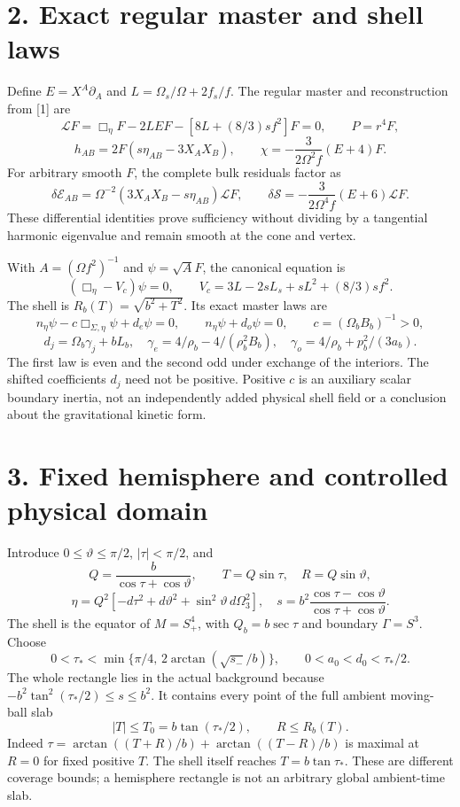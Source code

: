 \documentclass[
  10pt,
]{article}
\begin{document}
\section{2. Exact regular master and shell
laws}\label{exact-regular-master-and-shell-laws}

Define \(E=X^A\partial_A\) and \(L=\Omega_s/\Omega+2f_s/f\). The regular
master and reconstruction from {[}1{]} are \[
 \mathcal LF=\Box_\eta F-2LEF-[8L+(8/3)sf^2]F=0,
 \qquad P=r^4F,
\] \[
 h_{AB}=2F(s\eta_{AB}-3X_AX_B),\qquad
 \chi=-\frac3{2\Omega^2f}(E+4)F.                           \tag{5}
\] For arbitrary smooth \(F\), the complete bulk residuals factor as \[
 \delta\mathscr E_{AB}=\Omega^{-2}(3X_AX_B-s\eta_{AB})\mathcal LF,
 \qquad
 \delta\mathscr S=-\frac3{2\Omega^4f}(E+6)\mathcal LF.       \tag{6}
\] These differential identities prove sufficiency without dividing by a
tangential harmonic eigenvalue and remain smooth at the cone and vertex.

With \(A=(\Omega f^2)^{-1}\) and \(\psi=\sqrt A F\), the canonical
equation is \[
 (\Box_\eta-V_c)\psi=0,\qquad
 V_c=3L-2sL_s+sL^2+(8/3)sf^2.                              \tag{7}
\] The shell is \(R_b(T)=\sqrt{b^2+T^2}\). Its exact master laws are \[
 n_\eta\psi-c\Box_{\Sigma,\eta}\psi+d_e\psi=0,
 \qquad n_\eta\psi+d_o\psi=0,\qquad c=(\Omega_b B_b)^{-1}>0,
\] \[
 d_j=\Omega_b\gamma_j+bL_b,\quad
 \gamma_e=4/\rho_b-4/(\rho_b^2B_b),\quad
 \gamma_o=4/\rho_b+p_b^2/(3a_b).                            \tag{8}
\] The first law is even and the second odd under exchange of the
interiors. The shifted coefficients \(d_j\) need not be positive.
Positive \(c\) is an auxiliary scalar boundary inertia, not an
independently added physical shell field or a conclusion about the
gravitational kinetic form.

\section{3. Fixed hemisphere and controlled physical
domain}\label{fixed-hemisphere-and-controlled-physical-domain}

Introduce \(0\le\vartheta\le\pi/2\), \(|\tau|<\pi/2\), and \[
 Q=\frac b{\cos\tau+\cos\vartheta},\qquad
 T=Q\sin\tau,\quad R=Q\sin\vartheta,
\] \[
 \eta=Q^2[-d\tau^2+d\vartheta^2+\sin^2\vartheta\,d\Omega_3^2],
 \quad
 s=b^2\frac{\cos\tau-\cos\vartheta}{\cos\tau+\cos\vartheta}. \tag{9}
\] The shell is the equator of \(M=S^4_+\), with \(Q_b=b\sec\tau\) and
boundary \(\Gamma=S^3\). Choose \[
 0<\tau_*<\min\{\pi/4,\,2\arctan(\sqrt{s_-}/b)\},\qquad
 0<a_0<d_0<\tau_*/2.                                     \tag{10}
\] The whole rectangle lies in the actual background because
\(-b^2\tan^2(\tau_*/2)\le s\le b^2\). It contains every point of the
full ambient moving-ball slab \[
 |T|\le T_0=b\tan(\tau_*/2),\qquad R\le R_b(T).            \tag{11}
\] Indeed \(\tau=\arctan((T+R)/b)+\arctan((T-R)/b)\) is maximal at
\(R=0\) for fixed positive \(T\). The shell itself reaches
\(T=b\tan\tau_*\). These are different coverage bounds; a hemisphere
rectangle is not an arbitrary global ambient-time slab.
\end{document}
